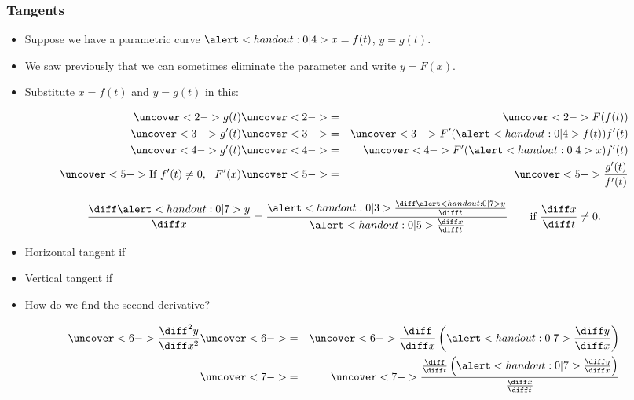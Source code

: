 \begin{frame}
\frametitle{Tangents}
\begin{itemize}
\item  Suppose we have a parametric curve $\alert<handout:0| 4>{x = f(t)}$, $y = g(t)$.
\item  We saw previously that we can sometimes eliminate the parameter and write $y = F(x)$.
\item<2->  Substitute $x = f(t)$ and $y = g(t)$ in this:
\end{itemize}
\begin{eqnarray*}
\uncover<2->{%
g(t)%
}%
& \uncover<2->{ = } &%
\uncover<2->{%
F(f(t))%
}\\%
\uncover<3->{%
g'(t)%
}%
& \uncover<3->{ = } &%
\uncover<3->{%
F'(\alert<handout:0| 4>{f(t)})f'(t)%
}\\%
\uncover<4->{%
g'(t)%
}%
& \uncover<4->{ = } &%
\uncover<4->{%
F'(\alert<handout:0| 4>{x})f'(t)%
}\\%
\uncover<5->{%
\textrm{If } f'(t)\neq 0, \ \ F'(x)%
}%
& \uncover<5->{ = } &%
\uncover<5->{%
\frac{g'(t)}{f'(t)}%
}%
\end{eqnarray*}
%
\end{frame}


\begin{frame}
\[
\frac{\diff \alert<handout:0| 7>{y}}{\diff x} = \frac{\alert<handout:0| 3>{\frac{\diff \alert<handout:0| 7>{y}}{\diff t}}}{\alert<handout:0| 5>{\frac{\diff x}{\diff t}}}  \qquad \textrm{if} \ \frac{\diff x}{\diff t} \neq 0.%
\]
\begin{itemize}
\item<1-| alert@2-3>  Horizontal tangent if 
\item<1-| alert@4-5>  Vertical tangent if 
\item<6->  How do we find the second derivative?
\end{itemize}
\begin{eqnarray*}
\uncover<6->{%
\frac{\diff^2 y}{\diff x^2}%
}%
& \uncover<6->{ = } &%
\uncover<6->{%
\frac{\diff}{\diff x}\left( \alert<handout:0| 7>{\frac{\diff y}{\diff x}}\right)%
}\\%
& \uncover<7->{ = } &%
\uncover<7->{%
\frac{\frac{\diff}{\diff t}\left( \alert<handout:0| 7>{\frac{\diff y}{\diff x}}\right)}{\frac{\diff x}{\diff t}}%
}%
\end{eqnarray*}
\end{frame}
